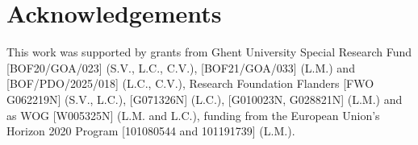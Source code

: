 \documentclass[
    a4paper,
    10pt,
    unnumberedsections,
    twoside,
    onecolumn,
]{LTJournalArticle}
\begin{document}
\section{Acknowledgements}
This work was supported by grants from Ghent University Special Research Fund [BOF20/GOA/023] (S.V., L.C., C.V.), [BOF21/GOA/033] (L.M.) and [BOF/PDO/2025/018] (L.C., C.V.), Research Foundation Flanders [FWO G062219N] (S.V., L.C.), [G071326N] (L.C.), [G010023N, G028821N] (L.M.) and as WOG [W005325N] (L.M. and L.C.), funding from the European Union’s Horizon 2020 Program [101080544 and 101191739] (L.M.).

\newpage

\printbibliography %

\fi\fi\fi
\end{document}
